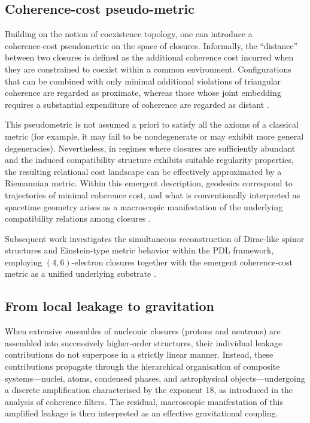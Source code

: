 \documentclass[11pt,a4paper]{article}
\begin{document}
\subsection{Coherence-cost pseudo-metric}
\label{subsec:coherence_metric}

Building on the notion of coexistence topology, one can introduce a coherence‑cost pseudometric on the space of closures. Informally, the “distance” between two closures is defined as the additional coherence cost incurred when they are constrained to coexist within a common environment. Configurations that can be combined with only minimal additional violations of triangular coherence are regarded as proximate, whereas those whose joint embedding requires a substantial expenditure of coherence are regarded as distant \citep{Coherence_Leakage_18_2026}.

This pseudometric is not assumed a priori to satisfy all the axioms of a classical metric (for example, it may fail to be nondegenerate or may exhibit more general degeneracies). Nevertheless, in regimes where closures are sufficiently abundant and the induced compatibility structure exhibits suitable regularity properties, the resulting relational cost landscape can be effectively approximated by a Riemannian metric. Within this emergent description, geodesics correspond to trajectories of minimal coherence cost, and what is conventionally interpreted as spacetime geometry arises as a macroscopic manifestation of the underlying compatibility relations among closures \citep{PDL_Main_2026,PDL_position}. 

Subsequent work investigates the simultaneous reconstruction of Dirac-like spinor structures and Einstein-type metric behavior within the PDL framework, employing \((4,6)\)-electron closures together with the emergent coherence‑cost metric as a unified underlying substrate \citep{Einstein_Dirac_PDL_2026}.

\subsection{From local leakage to gravitation}
\label{subsec:leakage_gravity}

When extensive ensembles of nucleonic closures (protons and neutrons) are assembled into successively higher-order structures, their individual leakage contributions do not superpose in a strictly linear manner. Instead, these contributions propagate through the hierarchical organisation of composite systems—nuclei, atoms, condensed phases, and astrophysical objects—undergoing a discrete amplification characterised by the exponent 18, as introduced in the analysis of coherence filters. The residual, macroscopic manifestation of this amplified leakage is then interpreted as an effective gravitational coupling.\citep{Exponent_18_PDL_2026,PDL_Main_2026}
\end{document}
